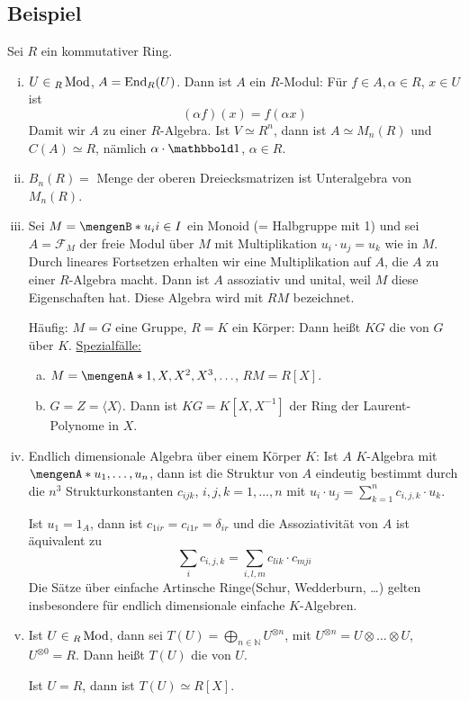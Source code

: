 \subsection[Weitere Beispiele für Algebren]{Beispiel} %
\label{sub:310}
Sei $R$ ein kommutativer Ring.
\begin{enumerate}[(i)]
	\item $U \in {_R \operatorname{Mod}}$, $A = \operatorname{End}_R(U)$. Dann ist $A$ ein $R$-Modul: Für $f \in A, \alpha \in R$, $x \in U$ ist
	\[
		(\alpha f) (x) = f (\alpha x)
	\]
	Damit wir $A$ zu einer $R$-Algebra. Ist $V \simeq R^n$, dann ist $A \simeq M_n(R)$ und $C(A) \simeq R$, nämlich $\alpha \cdot \ind$, $\alpha \in R$.
	\item $B_n(R)=$ Menge der oberen Dreiecksmatrizen ist Unteralgebra von $M_n(R)$.
	\item Sei $M= \set[u_i]{i \in I}$ ein Monoid (= Halbgruppe mit 1) und sei $A= \mathcal{F}_M$ der freie Modul über $M$ mit Multiplikation $u_i \cdot u_j = u_k$ wie in 
	$M$. Durch lineares Fortsetzen erhalten wir eine Multiplikation auf $A$, die $A$ zu einer $R$-Algebra macht. Dann ist $A$ assoziativ und unital, weil $M$ diese 
	Eigenschaften hat. Diese Algebra wird mit $RM$ bezeichnet.
	
	Häufig: $M=G$ eine Gruppe, $R=K$ ein Körper: Dann heißt $K G$ die  von $G$ über $K$. \uline{Spezialfälle:}
	\begin{enumerate}[(a)]
		\item $M= \set{1, X, X^2, X^3, \ldots }$, $RM= R[X]$.
		\item $G=Z = \langle X \rangle$. Dann ist $KG= K[X, X ^{-1}]$ der Ring der Laurent-Polynome in $X$.
	\end{enumerate}
	\item Endlich dimensionale Algebra über einem Körper $K$: Ist $A$ $K$-Algebra mit $\set{u_1, \ldots , u_n}$, dann ist die Struktur von $A$ eindeutig bestimmt durch die
	$n^3$ Strukturkonstanten $c_{ijk}$, $i,j,k = 1, \ldots ,n$ mit $u_i \cdot u_j = \sum_{k=1}^{n} c_{i,j,k} \cdot u_k$.
	
	Ist $u_1 = 1_A$, dann ist $c_{1ir} = c_{i1r} = \delta_{ir}$ und die Assoziativität von $A$ ist äquivalent zu
	\[
		\sum_{i} c_{i,j,k} = \sum_{i,l,m} c_{lik} \cdot c_{mji}
	\]
	Die Sätze über einfache Artinsche Ringe(Schur, Wedderburn, \ldots) gelten insbesondere für endlich dimensionale einfache $K$-Algebren.
	\item Ist $U \in {_R \operatorname{Mod}}$, dann sei $T(U) = \bigoplus_{n \in \mathds{N}} U^{\otimes n}$, mit $U^{\otimes n} = U \otimes  \ldots \otimes  U$, $U^{\otimes  0} = R$.
	Dann heißt $T(U)$ die  von $U$. 
	
	Ist $U=R$, dann ist $T(U) \simeq R[X]$.
\end{enumerate}

